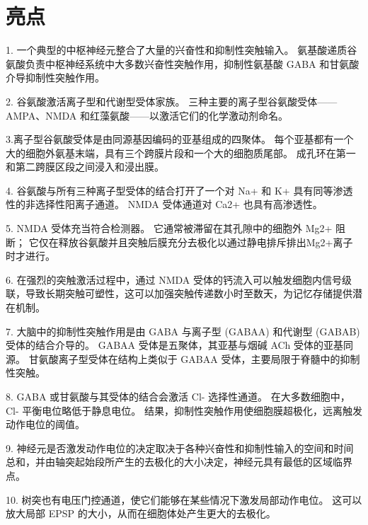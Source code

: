\section{亮点}

1. 一个典型的中枢神经元整合了大量的兴奋性和抑制性突触输入。
氨基酸递质谷氨酸负责中枢神经系统中大多数兴奋性突触作用，抑制性氨基酸 GABA 和甘氨酸介导抑制性突触作用。 


2. 谷氨酸激活离子型和代谢型受体家族。
三种主要的离子型谷氨酸受体——AMPA、NMDA 和红藻氨酸——以激活它们的化学激动剂命名。 


3.离子型谷氨酸受体是由同源基因编码的亚基组成的四聚体。
每个亚基都有一个大的细胞外氨基末端，具有三个跨膜片段和一个大的细胞质尾部。
成孔环在第一和第二跨膜区段之间浸入和浸出膜。 


4. 谷氨酸与所有三种离子型受体的结合打开了一个对 Na+ 和 K+ 具有同等渗透性的非选择性阳离子通道。
NMDA 受体通道对 Ca2+ 也具有高渗透性。


5. NMDA 受体充当符合检测器。
它通常被滞留在其孔隙中的细胞外 Mg2+ 阻断；
它仅在释放谷氨酸并且突触后膜充分去极化以通过静电排斥排出Mg2+离子时才进行。 


6. 在强烈的突触激活过程中，通过 NMDA 受体的钙流入可以触发细胞内信号级联，导致长期突触可塑性，这可以加强突触传递数小时至数天，为记忆存储提供潜在机制。 


7. 大脑中的抑制性突触作用是由 GABA 与离子型 (GABAA) 和代谢型 (GABAB) 受体的结合介导的。
GABAA 受体是五聚体，其亚基与烟碱 ACh 受体的亚基同源。
甘氨酸离子型受体在结构上类似于 GABAA 受体，主要局限于脊髓中的抑制性突触。 


8. GABA 或甘氨酸与其受体的结合会激活 Cl- 选择性通道。
在大多数细胞中，Cl- 平衡电位略低于静息电位。
结果，抑制性突触作用使细胞膜超极化，远离触发动作电位的阈值。 


9. 神经元是否激发动作电位的决定取决于各种兴奋性和抑制性输入的空间和时间总和，并由轴突起始段所产生的去极化的大小决定，神经元具有最低的区域临界点。 


10. 树突也有电压门控通道，使它们能够在某些情况下激发局部动作电位。
这可以放大局部 EPSP 的大小，从而在细胞体处产生更大的去极化。






